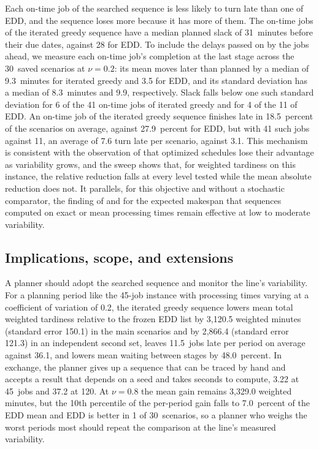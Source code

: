 \sumpara Each on-time job of the searched sequence is less likely to turn late than one of EDD, and the sequence loses more because it has more of them. \sumparaend
\fin The on-time jobs of the iterated greedy sequence have a median planned slack of 31~minutes before their due dates, against 28 for EDD. \fine
\fin To include the delays passed on by the jobs ahead, we measure each on-time job's completion at the last stage across the 30~saved scenarios at $\nu = 0.2$: its mean moves later than planned by a median of 9.3~minutes for iterated greedy and 3.5 for EDD, and its standard deviation has a median of 8.3~minutes and 9.9, respectively. \fine
\fin Slack falls below one such standard deviation for 6 of the 41 on-time jobs of iterated greedy and for 4 of the 11 of EDD. \fine
\fin An on-time job of the iterated greedy sequence finishes late in 18.5~percent of the scenarios on average, against 27.9~percent for EDD, but with 41 such jobs against 11, an average of 7.6 turn late per scenario, against 3.1. \fine
\fin This mechanism is consistent with the observation of \citet{aytug2005executing} that optimized schedules lose their advantage as variability grows, and the sweep shows that, for weighted tardiness on this instance, the relative reduction falls at every level tested while the mean absolute reduction does not. \fine
\fin It parallels, for this objective and without a stochastic comparator, the finding of \citet{framinan2015stochastic} and \citet{juan2014simheuristic} for the expected makespan that sequences computed on exact or mean processing times remain effective at low to moderate variability. \fine

\subsection{Implications, scope, and extensions}\label{sec:implications}

\sumpara A planner should adopt the searched sequence and monitor the line's variability. \sumparaend
\fin For a planning period like the 45-job instance with processing times varying at a coefficient of variation of 0.2, the iterated greedy sequence lowers mean total weighted tardiness relative to the frozen EDD list by 3,120.5 weighted minutes (standard error 150.1) in the main scenarios and by 2,866.4 (standard error 121.3) in an independent second set, leaves 11.5~jobs late per period on average against 36.1, and lowers mean waiting between stages by 48.0~percent. \fine
\fin In exchange, the planner gives up a sequence that can be traced by hand and accepts a result that depends on a seed and takes seconds to compute, 3.22 at 45~jobs and 37.2 at 120. \fine
\fin At $\nu = 0.8$ the mean gain remains 3,329.0 weighted minutes, but the 10th percentile of the per-period gain falls to 7.0~percent of the EDD mean and EDD is better in 1 of 30~scenarios, so a planner who weighs the worst periods most should repeat the comparison at the line's measured variability. \fine

